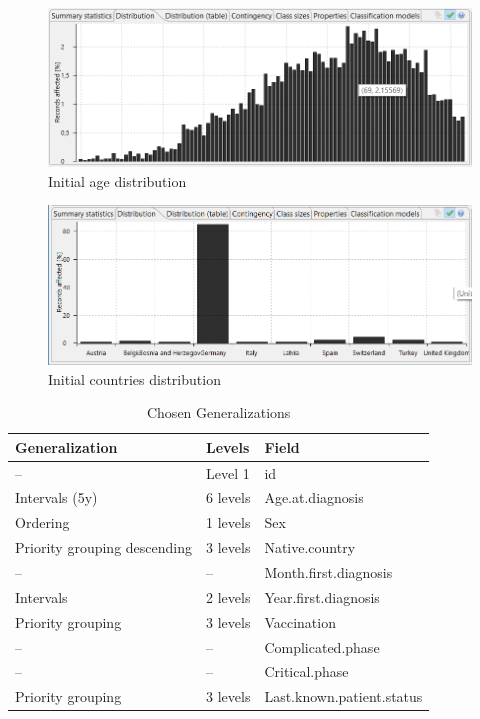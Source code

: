 \begin{figure}[ht]
  \centering
  \includegraphics[width=\textwidth, keepaspectratio]{assets/age_dist}
  \caption{Initial age distribution}
  \label{fig:my_label2}
\end{figure}

\begin{figure}[ht]
  \centering
  \includegraphics[width=\textwidth, keepaspectratio]{assets/countries_dist}
  \caption{Initial countries distribution}
  \label{fig:my_label1}
\end{figure}

\begin{table}[ht]
  \small
  \centering
  \caption{Chosen Generalizations}
  \begin{tabular}{lll}
    \toprule
    \textbf{Generalization}      & \textbf{Levels} & \textbf{Field}            \\
    \midrule
    --                           & Level 1         & id                        \\
    Intervals (5y)               & 6 levels        & Age.at.diagnosis          \\
    Ordering                     & 1 levels        & Sex                       \\
    Priority grouping descending & 3 levels        & Native.country            \\
    --                           & --              & Month.first.diagnosis     \\
    Intervals                    & 2 levels        & Year.first.diagnosis      \\
    Priority grouping            & 3 levels        & Vaccination               \\
    --                           & --              & Complicated.phase         \\
    --                           & --              & Critical.phase            \\
    Priority grouping            & 3 levels        & Last.known.patient.status \\
    \bottomrule
  \end{tabular}\label{tab:table2}
\end{table}

